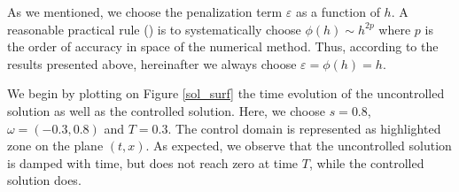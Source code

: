 As we mentioned, we choose the penalization term $\varepsilon$ as a function of $h$. A reasonable practical rule (\cite{boyer2013penalised}) is to systematically choose $\phi(h)\sim h^{2p}$ where $p$ is the order of accuracy in space of the numerical method. Thus, according to the results presented above, hereinafter we always choose $\varepsilon=\phi(h)=h$.

We begin by plotting on Figure \ref{sol_surf} the time evolution of the uncontrolled solution as well as the controlled solution. Here, we choose $s=0.8$, $\omega=(-0.3,0.8)$ and $T=0.3$. The control domain is represented as highlighted zone on the plane $(t,x)$. As expected, we observe that the uncontrolled solution is damped with time, but does not reach zero at time $T$, while the controlled solution does. 

%  
%
%
%  
%

